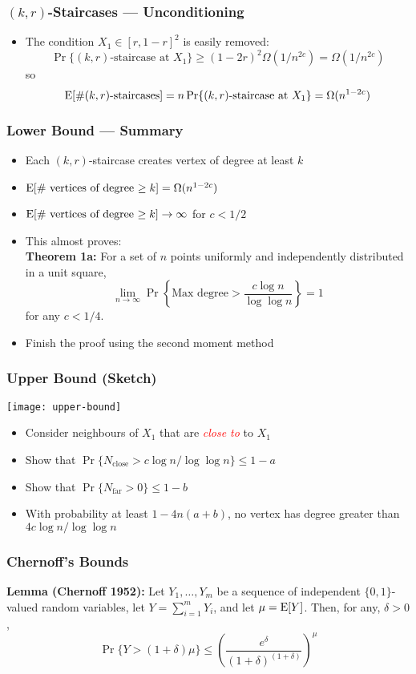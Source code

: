 \documentclass{beamer}
\renewcommand{\emph}[1]{\textcolor{red}{\it #1}}
\begin{document}
\frame
{
  \frametitle{$(k,r)$-Staircases --- Unconditioning}

  \begin{itemize}
    \item The condition $X_1\in [r,1-r]^2$ is easily removed:
    \[
      \Pr\{\mbox{$(k,r)$-staircase at $X_1$}\} 
        \ge (1-2r)^2 \Omega(1/n^{2c}) 
        = \Omega(1/n^{2c})
    \]
    so 
    \[ \mathrm{E}[\mbox{\#$(k,r)$-staircases}] = n\Pr\{\mbox{$(k,r)$-staircase at $X_1$}\}
      = \Omega(n^{1-2c}) \]
  \end{itemize}
}

\frame
{
  \frametitle{Lower Bound --- Summary}

  \begin{itemize}
    \item Each $(k,r)$-staircase creates vertex of degree at least $k$
    \item $\mathrm{E}[\mbox{\# vertices of degree $\ge k$}]=\Omega(n^{1-2c})$
    \item $\mathrm{E}[\mbox{\# vertices of degree $\ge k$}]\rightarrow\infty$ 
          for $c < 1/2$
    \item This almost proves:\\
       \textbf{Theorem 1a:}
           For a set of $n$ points uniformly and independently distributed
		in a unit square, 
           \[\lim_{n\rightarrow\infty}
              \Pr\left\{\mbox{Max degree} > \frac{c\log
n}{\log\log n}\right\} = 1 \]
           for any $c < 1/4$.
    \item Finish the proof using the second moment method
  \end{itemize}
}

\frame
{
  \frametitle{Upper Bound (Sketch)}

  \begin{center}
    \texttt{[image: upper-bound]}
  \end{center}
  \begin{itemize}
    \item Consider neighbours of $X_1$ that are \emph{close to} to $X_1$
    \item Show that $\Pr\{N_\mathrm{close} > c\log n/\log\log n\} \le 1-a$
    \item Show that $\Pr\{N_\mathrm{far} > 0\} \le 1-b$
    \item With probability at least $1-4n(a+b)$,
no vertex has degree greater than $4c\log n/\log\log n$
  \end{itemize}
}

\frame
{
  \frametitle{Chernoff's Bounds}

    \textbf{Lemma (Chernoff 1952):}
    Let $Y_1,\ldots,Y_m$ be a sequence of independent $\{0,1\}$-valued
    random variables, let $Y=\sum_{i=1}^m Y_i$, and let $\mu=\mathrm{E}[Y]$.
    Then, for any, $\delta > 0$,
    \[
       \Pr\{Y > (1+\delta)\mu\} 
         \le \left(\frac{e^{\delta}}{(1+\delta)^{(1+\delta)}}\right)^{\mu}
    \]
}
\end{document}
